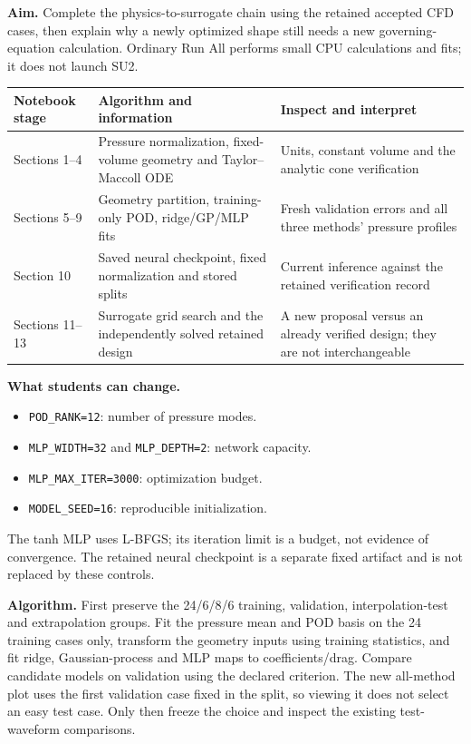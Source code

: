 \textbf{Aim.} Complete the physics-to-surrogate chain using the retained accepted CFD cases, then explain why a newly optimized shape still needs a new governing-equation calculation. Ordinary Run All performs small CPU calculations and fits; it does not launch SU2.

\begin{center}\small
\begin{tabularx}{\linewidth}{p{.16\linewidth}X X}
\toprule
Notebook stage & Algorithm and information & Inspect and interpret\\\midrule
Sections 1--4 & Pressure normalization, fixed-volume geometry and Taylor--Maccoll ODE & Units, constant volume and the analytic cone verification\\
Sections 5--9 & Geometry partition, training-only POD, ridge/GP/MLP fits & Fresh validation errors and all three methods' pressure profiles\\
Section 10 & Saved neural checkpoint, fixed normalization and stored splits & Current inference against the retained verification record\\
Sections 11--13 & Surrogate grid search and the independently solved retained design & A new proposal versus an already verified design; they are not interchangeable\\\bottomrule
\end{tabularx}
\end{center}

\textbf{What students can change.}
\begin{itemize}
\item \texttt{POD\_RANK=12}: number of pressure modes.
\item \texttt{MLP\_WIDTH=32} and \texttt{MLP\_DEPTH=2}: network capacity.
\item \texttt{MLP\_MAX\_ITER=3000}: optimization budget.
\item \texttt{MODEL\_SEED=16}: reproducible initialization.
\end{itemize}
The tanh MLP uses L-BFGS; its iteration limit is a budget, not evidence of convergence. The retained neural checkpoint is a separate fixed artifact and is not replaced by these controls.

\textbf{Algorithm.}
First preserve the 24/6/8/6 training, validation, interpolation-test and extrapolation groups. Fit the pressure mean and POD basis on the 24 training cases only, transform the geometry inputs using training statistics, and fit ridge, Gaussian-process and MLP maps to coefficients/drag. Compare candidate models on validation using the declared criterion. The new all-method plot uses the first validation case fixed in the split, so viewing it does not select an easy test case. Only then freeze the choice and inspect the existing test-waveform comparisons.

